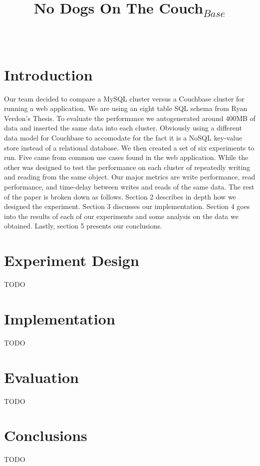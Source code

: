 \documentclass[]{IEEEtran}
\begin{document}
\title{No Dogs On The Couch$_{Base}$}


\author{
\\
}

\maketitle

\thispagestyle{empty}
\pagestyle{empty}

\section{Introduction}
Our team decided to compare a MySQL cluster versus a Couchbase cluster for running a
web application. We are using an eight table SQL schema from Ryan Verdon's Thesis. To evaluate
the performance we autogenerated around 400MB of data and inserted the same data into each cluster.
Obviously using a different data model for Couchbase to accomodate for the fact it is a NoSQL key-value store
instead of a relational database. We then created a set of six experiments to run. Five came from common 
use cases found in the web application. While the other was designed to test the performance on each cluster
of repeatedly writing and reading from the same object. Our major metrics are write performance, read performance,
and time-delay between writes and reads of the same data. The rest of the paper is broken down as follows.
Section 2 describes in depth how we designed the experiment. Section 3 discusses our implementation. Section 4 goes
into the results of each of our experiments and some analysis on the data we obtained. Lastly, section 5 presents 
our conclusions.

\section{Experiment Design}
TODO

\section{Implementation}
TODO

\section{Evaluation}
TODO

\section{Conclusions}
TODO

% 
% 
\end{document}
